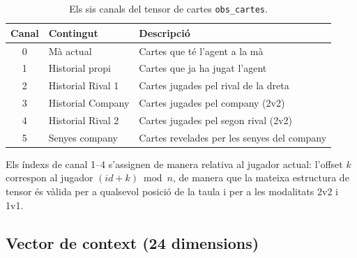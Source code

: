 \begin{table}[H]
  \centering
  \begin{tabular}{cll}
    \toprule
    Canal & Contingut & Descripció \\
    \midrule
    0 & Mà actual         & Cartes que té l'agent a la mà \\
    1 & Historial propi   & Cartes que ja ha jugat l'agent \\
    2 & Historial Rival 1 & Cartes jugades pel rival de la dreta \\
    3 & Historial Company & Cartes jugades pel company (2v2) \\
    4 & Historial Rival 2 & Cartes jugades pel segon rival (2v2) \\
    5 & Senyes company    & Cartes revelades per les senyes del company \\
    \bottomrule
  \end{tabular}
  \caption{Els sis canals del tensor de cartes \texttt{obs\_cartes}.}
  \label{tab:canals-cartes}
\end{table}

Els índexs de canal 1–4 s'assignen de manera relativa al jugador actual: l'offset
$k$ correspon al jugador $(id + k) \bmod n$, de manera que la mateixa estructura de
tensor és vàlida per a qualsevol posició de la taula i per a les modalitats 2v2 i 1v1.

\subsection*{Vector de context (24 dimensions)}

